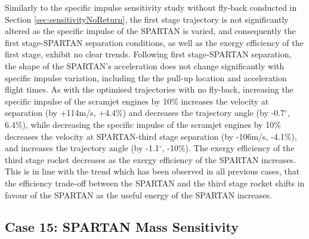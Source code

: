 Similarly to the specific impulse sensitivity study without fly-back conducted in Section \ref{sec:sensitivityNoReturn}, the first stage trajectory is not significantly altered as the specific impulse of the SPARTAN is varied, and consequently the first stage-SPARTAN separation conditions, as well as the exergy efficiency of the first stage, exhibit no clear trends. Following first stage-SPARTAN separation, the shape of the SPARTAN's acceleration does not change significantly with specific impulse variation, including the the pull-up location and acceleration flight times. As with the optimised trajectories with no fly-back, increasing the specific impulse of the scramjet engines by 10\% increases the velocity at separation (by +114m/s, +4.4\%) and decreases the trajectory angle (by -0.7$^\circ$, 6.4\%), while decreasing the specific impulse of the scramjet engines by 10\% decreases the velocity at SPARTAN-third stage separation (by -106m/s, -4.1\%), and increases the trajectory angle (by -1.1$^\circ$, -10\%).
The exergy efficiency of the third stage rocket decreases as the exergy efficiency of the SPARTAN increases. This is in line with the trend which has been observed in all previous cases, that the efficiency trade-off between the SPARTAN and the third stage rocket shifts in favour of the SPARTAN as the useful energy of the SPARTAN increases. 






\subsection{Case 15: SPARTAN Mass Sensitivity}\label{sec:m2var}


